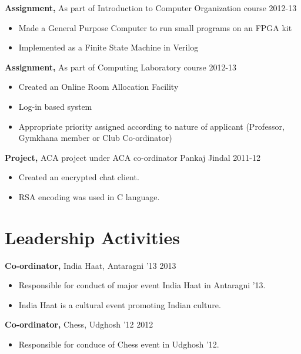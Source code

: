 \documentclass[margin]{res}
\begin{document}
\begin{resume}
{\bf Assignment,} As part of Introduction to Computer Organization course \hfill 2012-13
		\begin{itemize} \itemsep -2pt
		\item Made a General Purpose Computer to run small programs on an FPGA kit
		\item Implemented as a Finite State Machine in Verilog
\end{itemize}				 
{\bf Assignment,} As part of Computing Laboratory course \hfill  2012-13
\begin{itemize} \itemsep -2pt %
\item Created an Online Room Allocation Facility
\item Log-in based system
\item Appropriate priority assigned according to nature of applicant (Professor, Gymkhana member or Club Co-ordinator)
\end{itemize}



 {\bf Project,} ACA project under ACA co-ordinator Pankaj Jindal \hfill 2011-12
 \begin{itemize} \itemsep -2pt  %
 \item Created an encrypted chat client.
 \item RSA encoding was used in C language.
 \end{itemize}

 
 

\section{Leadership Activities} 
               {\bf Co-ordinator,} India Haat, Antaragni '13    \hfill         2013
          \begin{itemize}\itemsep -2pt
          
          
               \item Responsible for conduct of major event India Haat in Antaragni '13.
               \item India Haat is a cultural event promoting Indian culture.
          \end{itemize}

		{\bf Co-ordinator,} Chess, Udghosh '12 \hfill   2012 
                \begin{itemize} \itemsep -2pt
                 \item  Responsible for conduce of Chess event in Udghosh '12.
                

\end{itemize}
\end{resume}
\end{document}
